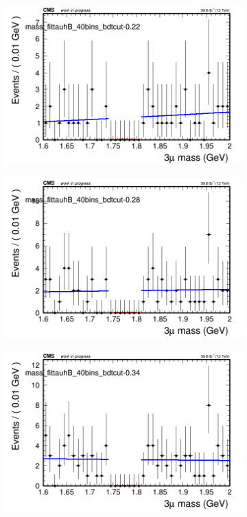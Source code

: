 \begin{figure}[H]
\begin{subfigure}{0.2\textwidth}
        \includegraphics[width=\textwidth]{power_law/plots/tauhB/massfit_tauhB_40bins_bdtcut-0.22.png}
        \caption{}
    \end{subfigure}
    \begin{subfigure}{0.2\textwidth}
        \includegraphics[width=\textwidth]{power_law/plots/tauhB/massfit_tauhB_40bins_bdtcut-0.28.png}
        \caption{}
    \end{subfigure}
    \begin{subfigure}{0.2\textwidth}
        \includegraphics[width=\textwidth]{power_law/plots/tauhB/massfit_tauhB_40bins_bdtcut-0.34.png}

\end{subfigure}
\end{figure}
